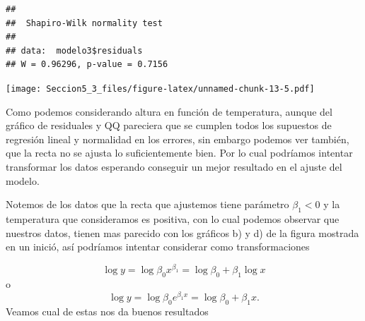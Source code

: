 \documentclass[
]{article}
\newenvironment{Shaded}{\begin{snugshade}}{\end{snugshade}}
\newcommand{\AttributeTok}[1]{\textcolor[rgb]{0.77,0.63,0.00}{#1}}
\newcommand{\DecValTok}[1]{\textcolor[rgb]{0.00,0.00,0.81}{#1}}
\newcommand{\FunctionTok}[1]{\textcolor[rgb]{0.00,0.00,0.00}{#1}}
\newcommand{\NormalTok}[1]{#1}
\newcommand{\OtherTok}[1]{\textcolor[rgb]{0.56,0.35,0.01}{#1}}
\newcommand{\SpecialCharTok}[1]{\textcolor[rgb]{0.00,0.00,0.00}{#1}}
\newcommand{\StringTok}[1]{\textcolor[rgb]{0.31,0.60,0.02}{#1}}
\begin{document}
\begin{verbatim}
## 
##  Shapiro-Wilk normality test
## 
## data:  modelo3$residuals
## W = 0.96296, p-value = 0.7156
\end{verbatim}

\begin{Shaded}
\end{Shaded}

\texttt{[image: Seccion5\_3\_files/figure-latex/unnamed-chunk-13-5.pdf]}

Como podemos considerando altura en función de temperatura, aunque del
gráfico de residuales y QQ pareciera que se cumplen todos los supuestos
de regresión lineal y normalidad en los errores, sin embargo podemos ver
también, que la recta no se ajusta lo suficientemente bien. Por lo cual
podríamos intentar transformar los datos esperando conseguir un mejor
resultado en el ajuste del modelo.

Notemos de los datos que la recta que ajustemos tiene parámetro
\(\beta_1<0\) y la temperatura que consideramos es positiva, con lo cual
podemos observar que nuestros datos, tienen mas parecido con los
gráficos b) y d) de la figura mostrada en un inició, así podríamos
intentar considerar como transformaciones

\[\log{y}=\log{\beta_0 x^{\beta_1}}=\log{\beta_0}+\beta_1\log{x}\] o
\[\log{y}=\log{\beta_0 e^{\beta_1 x}}=\log{\beta_0}+\beta_1 x.\] Veamos
cual de estas nos da buenos resultados

\begin{Shaded}
\end{Shaded}
\end{document}
